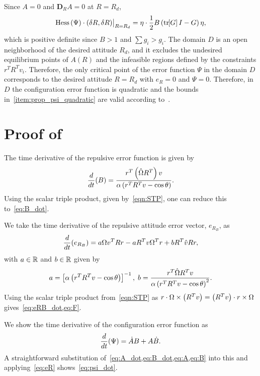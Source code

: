 Since $A=0$ and $\mathbf{D}_R A=0$ at $R=R_d$, 
\begin{align*}
    \mathrm{Hess} \, (\Psi)\cdot (\delta R,\delta R)\big|_{R=R_d} = \eta \cdot \frac{1}{2} B \left( \mathrm{tr}\negthickspace\left[ G \right]I -  G \right) \eta , 
\end{align*}
which is positive definite since \( B > 1\) and \( \sum g_i > g_i\). 
The domain \( D \) is an open neighborhood of the desired attitude \( R_d \), and it excludes the undesired equilibrium points of \( A(R) \) and the infeasible regions defined by the constraints \( r^T R^T v_i \). 
Therefore, the only critical point of the error function $\Psi$ in the domain $D$ corresponds to the desired attitude $R=R_d$ with $e_R=0$ and $\Psi=0$. 
Therefore, in \( D \) the configuration error function is quadratic and the bounds in~\cref{item:prop_psi_quadratic} are valid according to~\cite[Proposition 6.30]{bullo2004}.

\section{Proof of~}\label{proof:repulsive_configuration_error}
The time derivative of the repulsive error function is given by
\begin{gather*}
	\frac{d }{d t} (B) = \frac{r^T \left( \hat{\Omega} R^T \right) v}{\alpha \left( r^T R^T v - \cos \theta \right)}.
\end{gather*}
Using the scalar triple product, given by~\cref{eqn:STP}, one can reduce this to~\cref{eq:B_dot}.

We take the time derivative of the repulsive attitude error vector, \( e_{R_B} \), as
\begin{gather*}
	\frac{d }{d t}( e_{R_B} )= a \Omega v^T R r - a R^T v \Omega^T r + b R^T \hat{v} R r ,
\end{gather*}
with \( a \in \mathbb{R} \) and \( b \in \mathbb{R}\) given by 
\begin{gather*}
	a = \left[ \alpha \left( r^T R^T v - \cos \theta \right) \right]^{-1} , \;
	b = \frac{r^T \hat{\Omega} R^T v}{\alpha \left( r^T R^T v - \cos \theta \right)^2}.
\end{gather*}
Using the scalar triple product from~\cref{eqn:STP} as \( r \cdot \Omega \times \left( R^T v \right) = \left( R^T v \right) \cdot r \times \Omega \) gives~\cref{eq:eRB_dot,eq:F}.

We show the time derivative of the configuration error function as
\begin{gather*}
	\frac{d }{d t} (\Psi) = \dot{A} B + A \dot{B}.
\end{gather*}
A straightforward substitution of~\cref{eq:A_dot,eq:B_dot,eq:A,eq:B} into this and applying~\cref{eq:eR} shows~\cref{eq:psi_dot}.

